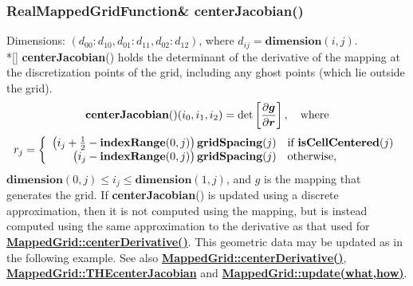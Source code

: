 \documentclass{article}
\begin{document}
  \subsubsection{RealMappedGridFunction\& centerJacobian()}
  \label{MappedGrid::centerJacobian()}
    Dimensions: $(d_{00}\colon d_{10},d_{01}\colon d_{11},d_{02}\colon d_{12})$, where $d_{ij} = \textbf{dimension}(i,j)$. \\*[\parskip]
    \textbf{centerJacobian}() holds the determinant of the derivative of the mapping at the discretization points of the grid,
    including any ghost points (which lie outside the grid).
    \[
      \textbf{centerJacobian}()(i_0,i_1,i_2) = \det\left[{\partial\mbox{\boldmath$g$} \over \partial\mbox{\boldmath$r$}}\right], \quad\mbox{where}
    \]
    \[
      r_j = \left\{ \begin{array}{rl}
        \big(i_j + {1\over2} - \textbf{indexRange}(0,j)\big)\,\textbf{gridSpacing}(j) & \mbox{if \bf{}isCellCentered}(j) \\
        \big(i_j             - \textbf{indexRange}(0,j)\big)\,\textbf{gridSpacing}(j) & \mbox{otherwise},                \\
      \end{array} \right.
    \]
    $\textbf{dimension}(0,j) \le i_j \le \textbf{dimension}(1,j)$, and {\boldmath $g$} is the mapping that generates the grid.
    If \textbf{centerJacobian}() is updated using a discrete approximation, then it is not computed using the mapping, but is instead
    computed using the same approximation to the derivative as that used for
    {\bf{}\hyperref{centerDerivative()}{centerDerivative() \rm(\S}{)}{MappedGrid::centerDerivative()}}.
    This geometric data may be updated as in the following example.
    See also {\bf{}\hyperref{centerDerivative()}{centerDerivative() \rm(\S}{)}{MappedGrid::centerDerivative()}},
    {\bf{}\hyperref{THEcenterJacobian}{THEcenterJacobian \rm(\S}{)}{MappedGrid::THEcenterJacobian}}
    and {\bf{}\hyperref{update(what,how)}{update(what,how) \rm(\S}{)}{MappedGrid::update(what,how)}}.
\end{document}
